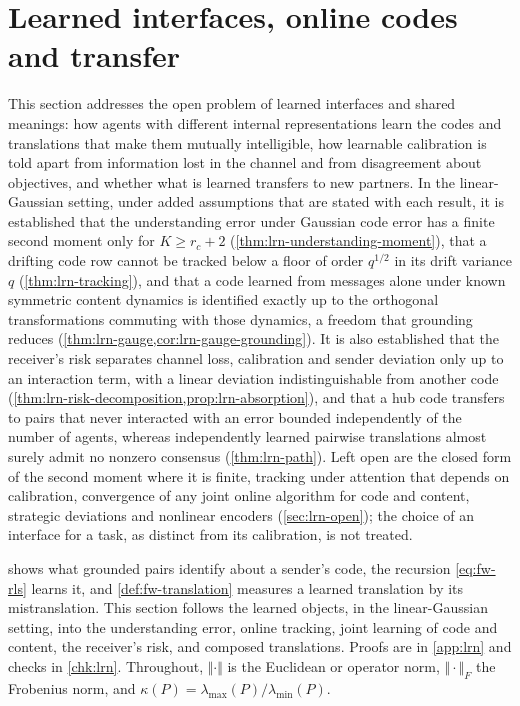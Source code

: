 \section{Learned interfaces, online codes and transfer}\label{sec:lrn}

This section addresses the open problem of learned interfaces and shared meanings: how agents with different internal representations learn the codes and translations that make them mutually intelligible, how learnable calibration is told apart from information lost in the channel and from disagreement about objectives, and whether what is learned transfers to new partners. In the linear-Gaussian setting, under added assumptions that are stated with each result, it is established that the understanding error under Gaussian code error has a finite second moment only for $K\ge r_c+2$ (\cref{thm:lrn-understanding-moment}), that a drifting code row cannot be tracked below a floor of order $q^{1/2}$ in its drift variance $q$ (\cref{thm:lrn-tracking}), and that a code learned from messages alone under known symmetric content dynamics is identified exactly up to the orthogonal transformations commuting with those dynamics, a freedom that grounding reduces (\cref{thm:lrn-gauge,cor:lrn-gauge-grounding}). It is also established that the receiver's risk separates channel loss, calibration and sender deviation only up to an interaction term, with a linear deviation indistinguishable from another code (\cref{thm:lrn-risk-decomposition,prop:lrn-absorption}), and that a hub code transfers to pairs that never interacted with an error bounded independently of the number of agents, whereas independently learned pairwise translations almost surely admit no nonzero consensus (\cref{thm:lrn-path}). Left open are the closed form of the second moment where it is finite, tracking under attention that depends on calibration, convergence of any joint online algorithm for code and content, strategic deviations and nonlinear encoders (\cref{sec:lrn-open}); the choice of an interface for a task, as distinct from its calibration, is not treated.

 shows what grounded pairs identify about a sender's code, the recursion \cref{eq:fw-rls} learns it, and \cref{def:fw-translation} measures a learned translation by its mistranslation. This section follows the learned objects, in the linear-Gaussian setting, into the understanding error, online tracking, joint learning of code and content, the receiver's risk, and composed translations. Proofs are in \cref{app:lrn} and checks in \cref{chk:lrn}. Throughout, $\Vert\cdot\Vert$ is the Euclidean or operator norm, $\Vert\cdot\Vert_F$ the Frobenius norm, and $\kappa(P)=\lambda_{\max}(P)/\lambda_{\min}(P)$.

